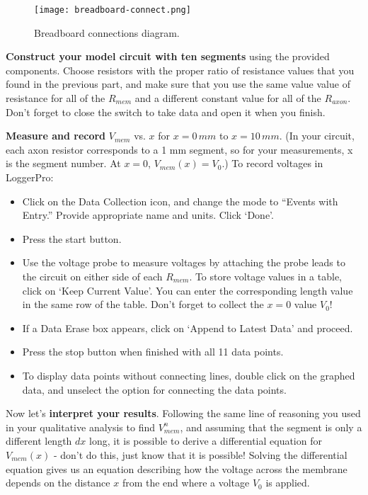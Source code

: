 \begin{figure}[hbtp]
	\centering
	\texttt{[image: breadboard-connect.png]}
	\caption{Breadboard connections diagram.}
	\label{fig:breadboard}
\end{figure}

\textbf{Construct your model circuit with ten segments} using the provided components.
Choose resistors with the proper ratio of resistance values that you found in the previous part, and make sure that you use the same value value of resistance for all of the $R_{mem}$ and a different constant value for all of the $R_{axon}$.
Don't forget to close the switch to take data and open it when you finish.
\par 
\textbf{Measure and record} $V_{mem}$ vs. $x$ for $x = 0 \, mm$ to $x = 10 \, mm$.
(In your circuit, each axon resistor corresponds to a 1 mm segment, so for your measurements, x is the segment number.
At $x=0$, $V_{mem}(x)=V_{0}$.)
To record voltages in LoggerPro:
\begin{itemize}
\itemsep-0.2em
\item Click on the Data Collection icon, and change the mode to ``Events with Entry.'' Provide appropriate name and units. Click `Done'.
\item Press the start button.
\item Use the voltage probe to measure voltages by attaching the probe leads to the circuit on either side of each $R_{mem}$. To store voltage values in a table, click on `Keep Current Value'. You can enter the corresponding length value in the same row of the table. Don't forget to collect the $x=0$ value $V_{0}$!
\item If a Data Erase box appears, click on `Append to Latest Data' and proceed.
\item Press the stop button when finished with all 11 data points.
\item To display data points without connecting lines, double click on the graphed data, and unselect the option for connecting the data points.
\end{itemize}
Now let's \textbf{interpret your results}.
Following the same line of reasoning you used in your qualitative analysis to find $V_{mem}^{n}$, and assuming that the segment is only a different length $dx$ long, it is possible to derive a differential equation for $V_{mem}(x)$ - don't do this, just know that it is possible!
Solving the differential equation gives us an equation describing how the voltage across the membrane depends on the distance $x$ from the end where a voltage $V_{0}$ is applied.
